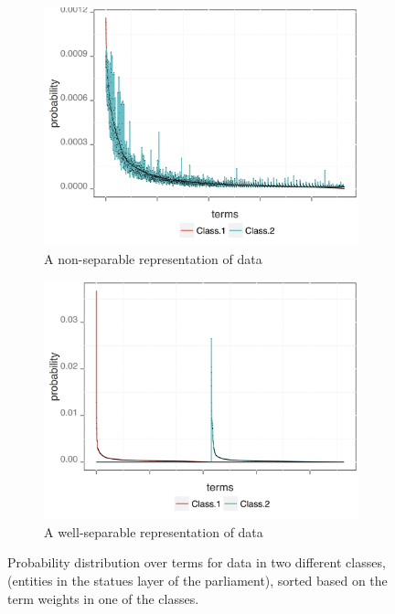 \begin{figure}[t]
\centering
\begin{subfigure}{0.49\textwidth}
\includegraphics[width=\linewidth]{02-part-01/chapter-03/figs_and_tables/img_example-slm.png}
\caption{\label{fig:sep-slm} \scriptsize{A non\:-\:separable representation of data}}
\end{subfigure}
\hfill
\begin{subfigure}{0.49\textwidth}
\includegraphics[width=\linewidth]{02-part-01/chapter-03/figs_and_tables/img_example-swlm.png}
\caption{\label{fig:sep-swlm} \scriptsize{A well\:-\:separable representation of data}}
\end{subfigure}
\caption{\label{fig:sep_rep} Probability distribution over terms for data in two different classes, (entities in the statues layer of the parliament), sorted based on the term weights in one of the classes.}
\end{figure}